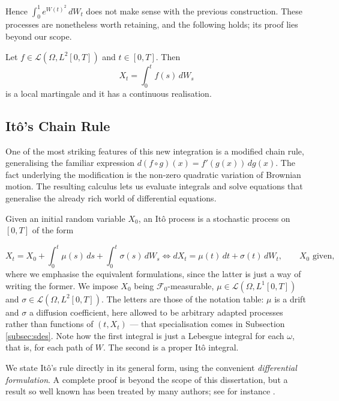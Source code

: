 Hence $\int_0^1 e^{W(t)^2}\, dW_t$ does not make sense with the previous construction. These processes are nonetheless worth retaining, and the following holds; its proof lies beyond our scope.

\begin{theorem}\label{thm:localmartingaleproperty} Let $f\in \mathcal{L}(\Omega,L^2[0,T])$ and $t \in [0,T]$. Then
$$
X_ t = \int_0^t f(s) \,dW_s
$$
    is a local martingale and it has a continuous realisation. \qedopentext
\end{theorem}

\subsection{Itô's Chain Rule}

One of the most striking features of this new integration is a modified chain rule, generalising the familiar expression $d(f\circ g)(x) = f'(g(x))\,dg(x)$. The fact underlying the modification is the non-zero quadratic variation of Brownian motion. The resulting calculus lets us evaluate integrals and solve equations that generalise the already rich world of differential equations.

\begin{definition}\label{def:itoprocess}

Given an initial random variable $X_0$, an Itô process is a stochastic process on $[0,T]$ of the form

$$
X_t = X_0 + \int_0^t \mu(s) \,ds  +\int_0^t \sigma(s) \, dW_s  \iff dX_t = \mu(t) \,dt + \sigma(t) \, dW_t, \qquad X_0 \text{ given,}
$$
    where we emphasise the equivalent formulations, since the latter is just a way of writing the former. We impose $X_0$ being $\mathcal F_0$-measurable, $\mu \in \mathcal{L}(\Omega,L^1[0,T])$ and $\sigma \in \mathcal{L}(\Omega,L^2[0,T]).$ The letters are those of the notation table: $\mu$ is a drift and $\sigma$ a diffusion coefficient, here allowed to be arbitrary adapted processes rather than functions of $(t,X_t)$ --- that specialisation comes in Subsection \ref{subsec:sdes}. Note how the first integral is just a Lebesgue integral for each $\omega$, that is, for each path of $W$. The second is a proper Itô integral.
\end{definition}

We state Itô's rule directly in its general form, using the convenient \textit{differential formulation}. A complete proof is beyond the scope of this dissertation, but a result so well known has been treated by many authors; see for instance \cite{kuo2006}.

